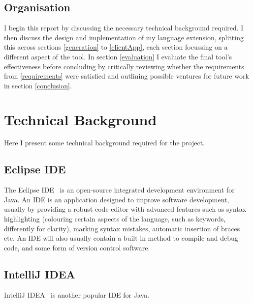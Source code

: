 \documentclass{article}
\begin{document}
\subsection{Organisation} 
I begin this report by discussing the necessary technical background required. I then discuss the design and implementation of my language extension, splitting this across sections \ref{generation} to \ref{clientApp}, each section focussing on a different aspect of the tool. In section \ref{evaluation} I evaluate the final tool's effectiveness before concluding by critically reviewing whether the requirements from \ref{requirements} were satisfied and outlining possible ventures for future work in section \ref{conclusion}. 

\section{Technical Background}
Here I present some technical background required for the project.
\subsection{Eclipse IDE}
The Eclipse IDE~\cite{eclipse} is an open-source integrated development environment for Java. An IDE is an application designed to improve software development, usually by providing a robust code editor with advanced features such as syntax highlighting (colouring certain aspects of the language, such as keywords, differently for clarity), marking syntax mistakes, automatic insertion of braces etc. An IDE will also usually contain a built in method to compile and debug code, and some form of version control software. 
\subsection{IntelliJ IDEA}
IntelliJ IDEA~\cite{intellij} is another popular IDE for Java.
\end{document}
